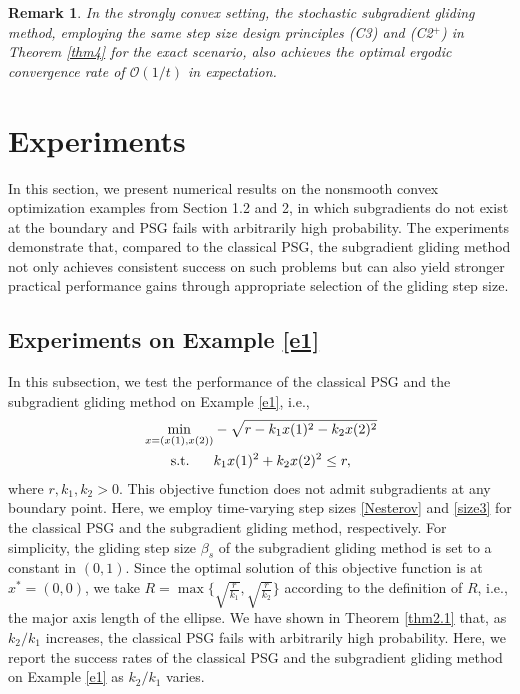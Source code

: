 \documentclass[sn-mathphys]{JORSC-jnl}%
\theoremstyle{thmstyleone}%
\newtheorem{remark}{Remark}[section]%
\theoremstyle{thmstylethree}%
\def\ST{\songti\rm\relax}
\def\ST{{\rm s.t.}}
\begin{document}
\begin{remark}
	In the strongly convex setting, the stochastic subgradient gliding method, employing the same step size design principles (C3) and (C2$^+$) in Theorem \ref{thm4} for the exact scenario, also achieves the optimal ergodic convergence rate of $\mathcal{O}(1/t)$ in expectation.
\end{remark}

\section{Experiments}
In this section, we present numerical results on the nonsmooth convex optimization examples from Section 1.2 and 2, in which subgradients do not exist at the boundary and PSG fails with arbitrarily high probability. The experiments demonstrate that, compared to the classical PSG, the subgradient gliding method not only achieves consistent success on such problems but can also yield stronger practical performance gains through appropriate selection of the gliding step size.

\subsection{Experiments on Example \ref{e1}}
In this subsection, we test the performance of the classical PSG and the subgradient gliding method on Example \ref{e1}, i.e.,
\begin{equation}
	\begin{alignedat}{2}
		&\min_{x = (x(1), x(2))} &&-\sqrt{r - k_1x(1)^2-k_2x(2)^2}\\
		&~~~~~~\ST&&k_1x(1)^2+k_2x(2)^2\le r,
		\label{m1}
	\end{alignedat}
\end{equation}
where $r, k_1, k_2 > 0$. This objective function does not admit subgradients at any boundary point. Here, we employ time-varying step sizes \eqref{Nesterov} and \eqref{size3} for the classical PSG and the subgradient gliding method, respectively. For simplicity, the gliding step size $\beta_s$ of the subgradient gliding method is set to a constant in $(0,1)$. Since the optimal solution of this objective function is at $x^*=(0,0)$, we take $R = \max\{\sqrt{\frac{r}{k_1}}, \sqrt{\frac{r}{k_2}}\}$ according to the definition of $R$, i.e., the major axis length of the ellipse. We have shown in Theorem \ref{thm2.1} that, as $k_2/k_1$ increases, the classical PSG fails with arbitrarily high probability. Here, we report the success rates of the classical PSG and the subgradient gliding method on Example \ref{e1} as $k_2/k_1$ varies. 
\end{document}
